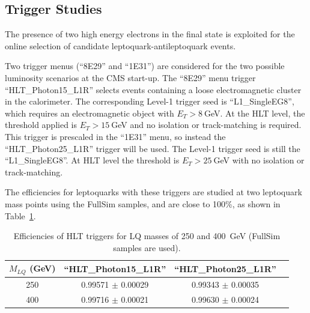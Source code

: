 \documentclass{cmspaper}
\begin{document}
\begin{linenumbers}
\section{Trigger Studies} \label{sec:trig}

The presence of two high energy electrons in the final state is 
exploited for the online selection 
of candidate leptoquark-antileptoquark events.

Two trigger menus (``8E29'' and ``1E31'')  are considered for the two
possible luminosity scenarios at the CMS start-up.
The ``8E29'' menu trigger ``HLT\_Photon15\_L1R'' selects events containing
a loose electromagnetic cluster in the calorimeter.
The corresponding Level-1 trigger seed is ``L1\_SingleEG8'', 
which requires an electromagnetic object with 
$E_T>8~$GeV. At the HLT level, the threshold applied is $E_T>15~$GeV and 
no isolation or track-matching is required.
This trigger is prescaled in the
``1E31'' menu, so instead the
``HLT\_Photon25\_L1R'' trigger will be used. 
The Level-1 trigger seed is still the ``L1\_SingleEG8''. At HLT level the 
threshold is $E_T>25~$GeV with no isolation or track-matching.

The efficiencies for leptoquarks with these triggers 
are studied at two leptoquark mass points using the FullSim 
samples, and are close to
100\%, as shown in Table~\ref{tab:HLTEffic}.

\begin{table}[htbp]
\begin{center}
\begin{tabular}{|c|c|c|c|}
\hline\hline
 $M_{LQ}$ (GeV)     &   ``HLT\_Photon15\_L1R''   &   ``HLT\_Photon25\_L1R'' \\
\hline\hline
250                 & 0.99571  $\pm$ 0.00029     & 0.99343  $\pm$ 0.00035   \\
400                 & 0.99716  $\pm$ 0.00021     & 0.99630  $\pm$ 0.00024   \\
\hline\hline
\end{tabular}
\end{center}
\caption{Efficiencies of HLT triggers for LQ masses of 250 and 400~GeV (FullSim samples are used).}
\label{tab:HLTEffic}
\end{table}


\end{linenumbers}
\end{document}
